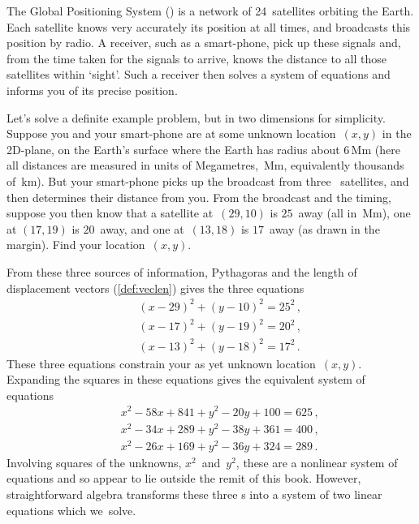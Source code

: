 \begin{example} \label{eg:gps2}
The Global Positioning System (\gps) is a network of 24~satellites orbiting the Earth.
Each satellite knows very accurately its position at all times, and broadcasts this position by radio.
A receiver, such as a smart-phone, pick up these signals and, from the time taken for the signals to arrive, knows the distance to all those satellites within `sight'.
Such a receiver then solves a system of equations and informs you of its precise position.

Let's solve a definite example problem, but in two dimensions for simplicity.
Suppose you and your smart-phone are at some unknown location~\((x,y)\) in the 2D-plane, on the Earth's surface where the Earth has radius about \(6\)\,Mm (here all distances are measured in units of Megametres,~Mm, equivalently thousands of~km).
But your smart-phone picks up the broadcast from three \gps\ satellites, and then determines their distance from you.
%
From the broadcast and the timing, suppose you then know that a satellite at~\((29,10)\) is \(25\)~away (all in~Mm), one at \((17,19)\) is \(20\)~away, and one at~\((13,18)\) is \(17\)~away (as drawn in the margin).
Find your location~\((x,y)\).


\begin{solution} 
From these three sources of information, Pythagoras and the length of displacement vectors (\cref{def:veclen}) gives the three equations
\begin{eqnarray*}
&&(x-29)^2+(y-10)^2=25^2\,,
\\&&(x-17)^2+(y-19)^2=20^2\,,
\\&&(x-13)^2+(y-18)^2=17^2\,.
\end{eqnarray*}
These three equations constrain your as yet unknown location~\((x,y)\).
Expanding the squares in these equations gives the equivalent system of equations
\begin{eqnarray*}
&&x^2-58x+841+y^2-20y+100=625\,,
\\&&x^2-34x+289+y^2-38y+361=400\,,
\\&&x^2-26x+169+y^2-36y+324=289\,.
\end{eqnarray*}
Involving squares of the unknowns, \(x^2\)~and~\(y^2\), these are a nonlinear system of equations and so appear to lie outside the remit of this book.  
However, straightforward algebra transforms these three s into a system of two linear equations which we~solve.


\end{solution}
\end{example}
